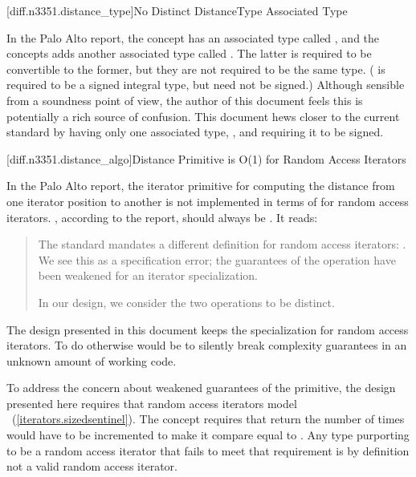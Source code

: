 [diff.n3351.distance_type]{No Distinct DistanceType Associated Type}

\pnum
In the Palo Alto report, the  concept has an associated type called
, and the  concepts adds another associated type
called . The latter is required to be convertible to the former, but they are
not required to be the same type. ( is required to be a signed integral type,
but  need not be signed.) Although sensible from a soundness point of view,
the author of this document feels this is potentially a rich source of confusion. This document hews
closer to the current standard by having only one associated type, , and
requiring it to be signed.

[diff.n3351.distance_algo]{Distance Primitive is O(1) for Random Access Iterators}

\pnum
In the Palo Alto report, the  iterator primitive for computing the distance from one
iterator position to another is not implemented in terms of  for random access
iterators. , according to the report, should always be . It reads:

\begin{quote}
The standard mandates a different definition for random access iterators:
. We see this as a specification error; the guarantees of the
 operation have been weakened for an iterator specialization.

In our design, we consider the two operations to be distinct.
\end{quote}

The design presented in this document keeps the specialization for random access iterators. To do
otherwise would be to silently break complexity guarantees in an unknown amount of working code.

To address the concern about weakened guarantees of the  primitive, the design
presented here requires that random access iterators model
~(\ref{iterators.sizedsentinel}). The 
concept requires that  return the number of times  would have to be
incremented to make it compare equal to . Any type purporting to be a random access
iterator that fails to meet that requirement is by definition not a valid random access iterator.

